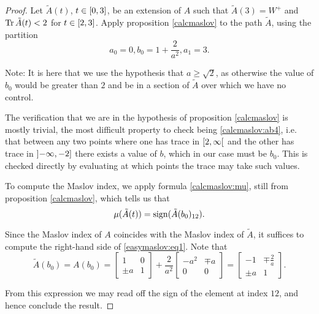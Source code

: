 \begin{proof}
Let $\tilde A(t)$, $t \in \interval03$, be an extension of $A$ such that $\tilde A(3) = W^+$ and $\operatorname{Tr} \tilde A(t) < 2$ for $t \in \interval23$. Apply proposition \ref{calcmaslov} to the path $\tilde A$, using the partition
\begin{equation}
a_0 = 0, b_0 = 1 + \frac2{a^2}, a_1 = 3.
\end{equation}

Note: It is here that we use the hypothesis that $a \geq \sqrt2$, as otherwise the value of $b_0$ would be greater than $2$ and be in a section of $\tilde A$ over which we have no control.

The verification that we are in the hypothesis of proposition \ref{calcmaslov} is mostly trivial, the most difficult property to check being \ref{calcmaslov:ab4}, i.e. that between any two points where one has trace in $\rinterval2\infty$ and the other has trace in $\linterval{-\infty}{-2}$ there exists a value of $b$, which in our case must be $b_0$. This is checked directly by evaluating at which points the trace may take such values.

To compute the Maslov index, we apply formula \eqref{calcmaslov:mu}, still from proposition \ref{calcmaslov}, which tells us that
\begin{equation}\label{easymaslov:eq1}
\mu(\tilde A(t)) = \operatorname{sign}(\tilde A(b_0)_{12}).
\end{equation}

Since the Maslov index of $A$ coincides with the Maslov index of $\tilde A$, it suffices to compute the right-hand side of \eqref{easymaslov:eq1}. Note that
\begin{equation}
\tilde A(b_0) = A(b_0) = 
\begin{bmatrix}
1 & 0\\
\pm a & 1
\end{bmatrix}
+
\frac2{a^2}
\begin{bmatrix}
- a^2 &  \mp a\\
0 & 0
\end{bmatrix}
=
\begin{bmatrix}
-1 & \mp \frac2a\\
\pm a & 1
\end{bmatrix}.
\end{equation}

From this expression we may read off the sign of the element at index $12$, and hence conclude the result.
\end{proof}

